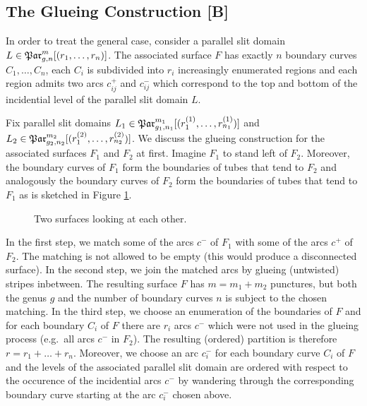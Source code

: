 \subsection{The Glueing Construction [B]}
In order to treat the general case, consider a parallel slit domain $L \in \Parr$.
The associated surface $F$ has exactly $n$ boundary curves $C_1, \ldots, C_n$,
each $C_i$ is subdivided into $r_i$ increasingly enumerated regions and each region admits two arcs $c^+_{ij}$ and $c^-_{ij}$ which correspond to the top and bottom
of the incidential level of the parallel slit domain $L$.

Fix parallel slit domains $L_1 \in \Par_{g_1, n_1}^{m_1}[(r_1^{(1)}, \ldots, r_{n_1}^{(1)})]$ and $L_2 \in \Par_{g_2, n_2}^{m_2}[(r_1^{(2)}, \ldots, r_{n_2}^{(2)})]$.
We discuss the glueing construction for the associated surfaces $F_1$ and $F_2$ at first.
Imagine $F_1$ to stand left of $F_2$.
Moreover, the boundary curves of $F_1$ form the boundaries of tubes that tend to $F_2$ and analogously 
the boundary curves of $F_2$ form the boundaries of tubes that tend to $F_1$ 
as is sketched in Figure \ref{homology_operations:parallel_patching_slit_pics:general_glueing_two_surfaces_look_at_each_other}.
\begin{figure}[ht]
    \centering
    \def\svgwidth{\columnwidth}
    
    \caption{\label{homology_operations:parallel_patching_slit_pics:general_glueing_two_surfaces_look_at_each_other}Two surfaces looking at each other.}
\end{figure}

In the first step, we match some of the arcs $c^-$ of $F_1$ with some of the arcs $c^+$ of $F_2$.
The matching is not allowed to be empty (this would produce a disconnected surface).
In the second step, we join the matched arcs by glueing (untwisted) stripes inbetween.
The resulting surface $F$ has $m= m_1+m_2$ punctures, but both the genus $g$ and the number of boundary curves $n$ is subject to the chosen matching.
In the third step, we choose an enumeration of the boundaries of $F$ and for each boundary $C_i$ of $F$
there are $r_i$ arcs $c^-$ which were not used in the glueing process (e.g.\ all arcs $c^-$ in $F_2$).
The resulting (ordered) partition is therefore $r = r_1 + \ldots +r_n$.
Moreover, we choose an arc $c^-_i$ for each boundary curve $C_i$ of $F$ and
the levels of the associated parallel slit domain are ordered with respect to the occurence of the incidential arcs $c^-$
by wandering through the corresponding boundary curve starting at the arc $c^-_i$ chosen above.


